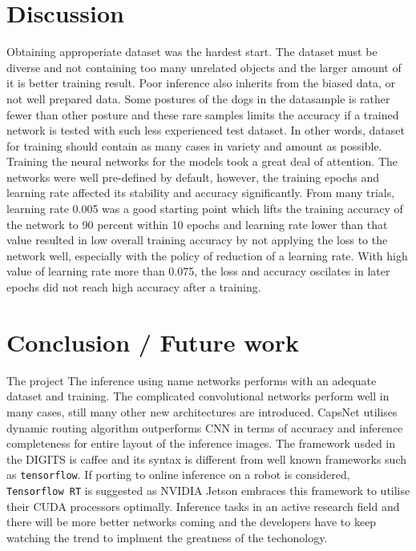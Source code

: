 \documentclass[10pt,journal,compsoc]{IEEEtran}
\begin{document}
\section{Discussion}
Obtaining approperiate dataset was the hardest start. The dataset must be diverse and not containing too many unrelated objects and the larger  amount of it is better training result.
Poor inference also inherits from the biased data, or not well prepared data. Some postures of the dogs in the datasample is rather fewer than other posture and these rare samples limits the accuracy if a trained network is tested with such less experienced test dataset. In other words, dataset for training should contain as many cases in variety and amount as possible.
Training the neural networks for the models took a great deal of attention. The networks were well pre-defined by default, however, the training epochs and learning rate affected its stability and accuracy significantly. From many trials, learning rate 0.005 was a good starting point which lifts the training accuracy of the network to 90 percent within 10 epochs and learning rate lower than that value resulted in low overall training accuracy by not applying the loss to the network well, especially with the policy of reduction of a learning rate. With high value of learning rate more than 0.075, the loss and accuracy oscilates in later epochs did not reach high accuracy after a training.
 \section{Conclusion / Future work}
The project 
The inference using name networks performs with an adequate dataset and training. The complicated convolutional networks perform well in many cases, still many other new architectures are introduced. CapsNet \cite{Sabour2017} utilises dynamic routing algorithm outperforms CNN in terms of accuracy and inference completeness for entire layout of the inference images.
The framework usded in the DIGITS is caffee and its syntax is different from well known frameworks such as \verb!tensorflow!. If porting to online inference on a robot is considered, \verb!Tensorflow RT! is suggested as NVIDIA Jetson embraces this framework to utilise their CUDA processors optimally.
Inference tasks in an active research field and there will be more better networks coming and the developers have to keep watching the trend to implment the greatness of the techonology.
 

\end{document}
